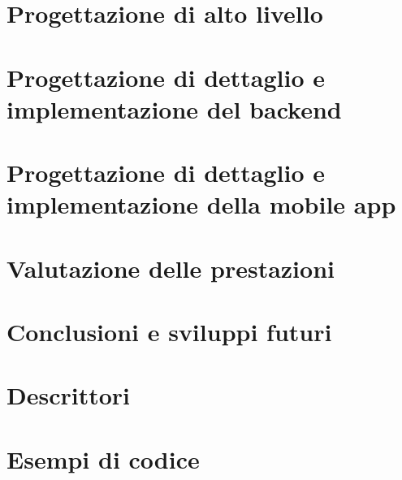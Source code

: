 \documentclass[11pt,english,italian,openright]{book}
\begin{document}



\chapter{Progettazione di alto livello\label{ch:progettazione-alto-livello}}




\chapter{Progettazione di dettaglio e implementazione del backend\label{ch:implementazione-backend}}




\chapter{Progettazione di dettaglio e implementazione della mobile app\label{ch:implementazione-app}}




\chapter{Valutazione delle prestazioni\label{ch:performance}}




\chapter{Conclusioni e sviluppi futuri\label{ch:conclusioni}}






\appendix

\chapter{Descrittori\label{app:appendice-descrittori}}



\chapter{Esempi di codice\label{app:appendice-esempi}}


\end{document}
